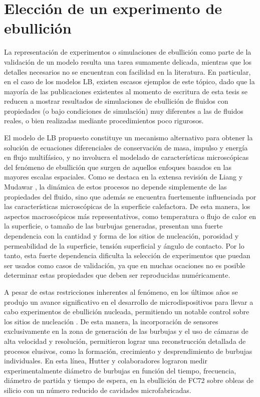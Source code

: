 \section{Elecci\'on de un experimento de ebullici\'on}

La representaci\'on de experimentos o simulaciones de ebullici\'on como parte de la validaci\'on de un modelo resulta una tarea sumamente delicada, mientras que los detalles necesarios no se encuentran con facilidad en la literatura. En particular, en el caso de los modelos LB, existen escasos ejemplos de este t\'opico, dado que la mayor\'ia de las publicaciones existentes al momento de escritura de esta tesis se reducen a mostrar resultados de simulaciones de ebullici\'on de fluidos con propiedades (o bajo condiciones de simulaci\'on) muy diferentes a las de fluidos reales, o bien realizadas mediante procedimientos poco rigurosos. 

El modelo de LB propuesto constituye un mecanismo alternativo para obtener la soluci\'on de ecuaciones diferenciales de conservaci\'on de masa, impulso y energ\'ia en flujo multif\'asico, y no involucra el modelado de caracter\'isticas microsc\'opicas del fen\'omeno de ebullici\'on que surgen de aquellos enfoques basados en las mayores escalas espaciales. Como se destaca en la extensa revisi\'on de Liang y Mudawar \cite{liang_review_2019}, la din\'amica de estos procesos no depende simplemente de las propiedades del fluido, sino que adem\'as se encuentra fuertemente influenciada por las caracter\'isticas microsc\'opicas de la superficie calefactora. De esta manera, los aspectos macrosc\'opicos m\'as representativos, como temperatura o flujo de calor en la superficie, o tama\~no de las burbujas generadas, presentan una fuerte dependencia con la cantidad y forma de los sitios de nucleaci\'on, porosidad y permeabilidad de la superficie, tensi\'on superficial y \'angulo de contacto. Por lo tanto, esta fuerte dependencia dificulta la selecci\'on de experimentos que puedan ser usados como casos de validaci\'on, ya que en muchas ocaciones no es posible determinar estas propiedades que deben ser reproducidas num\'ericamente.

A pesar de estas restricciones inherentes al fen\'omeno, en los \'ultimos a\~nos se produjo un avance significativo en el desarrollo de microdispositivos para llevar a cabo experimentos de ebullici\'on nucleada, permitiendo un notable control sobre los sitios de nucleaci\'on \cite{gregorcic_scalable_2018, liu_experimental_2019}. De esta manera, la incorporaci\'on de sensores exclusivamente en la zona de generaci\'on de las burbujas y el uso de c\'amaras de alta velocidad y resoluci\'on, permitieron lograr una reconstrucci\'on detallada de procesos elusivos, como la formaci\'on, crecimiento y desprendimiento de burbujas individuales. En esta l\'inea, Hutter y colaboradores \cite{hutter_experimental_2009, hutter_experimental_2010} lograron medir experimentalmente di\'ametro de burbujas en funci\'on del tiempo, frecuencia, di\'ametro de partida y tiempo de espera, en la ebullici\'on de FC72 sobre obleas de silicio con un n\'umero reducido de cavidades microfabricadas. 

